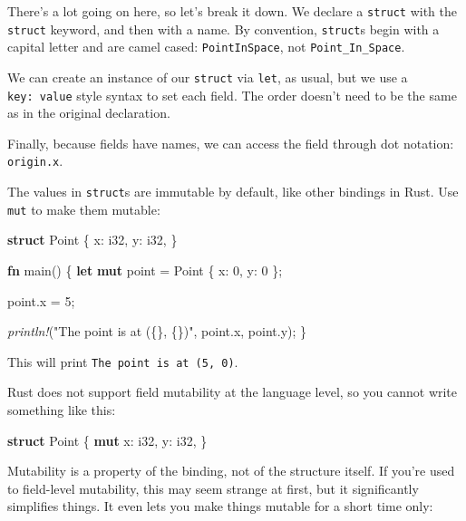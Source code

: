 \documentclass[a4paper,]{book}
\newenvironment{Shaded}{\begin{snugshade}}{\end{snugshade}}
\newcommand{\KeywordTok}[1]{\textcolor[rgb]{0.13,0.29,0.53}{\textbf{{#1}}}}
\newcommand{\DataTypeTok}[1]{\textcolor[rgb]{0.13,0.29,0.53}{{#1}}}
\newcommand{\DecValTok}[1]{\textcolor[rgb]{0.00,0.00,0.81}{{#1}}}
\newcommand{\StringTok}[1]{\textcolor[rgb]{0.31,0.60,0.02}{{#1}}}
\newcommand{\PreprocessorTok}[1]{\textcolor[rgb]{0.56,0.35,0.01}{\textit{{#1}}}}
\newcommand{\NormalTok}[1]{{#1}}
\begin{document}
There's a lot going on here, so let's break it down. We declare a
\texttt{struct} with the \texttt{struct} keyword, and then with a name.
By convention, \texttt{struct}s begin with a capital letter and are
camel cased: \texttt{PointInSpace}, not \texttt{Point\_In\_Space}.

We can create an instance of our \texttt{struct} via \texttt{let}, as
usual, but we use a \texttt{key:\ value} style syntax to set each field.
The order doesn't need to be the same as in the original declaration.

Finally, because fields have names, we can access the field through dot
notation: \texttt{origin.x}.

The values in \texttt{struct}s are immutable by default, like other
bindings in Rust. Use \texttt{mut} to make them mutable:

\begin{Shaded}
\begin{Highlighting}[]
\KeywordTok{struct} \NormalTok{Point \{}
    \NormalTok{x: }\DataTypeTok{i32}\NormalTok{,}
    \NormalTok{y: }\DataTypeTok{i32}\NormalTok{,}
\NormalTok{\}}

\KeywordTok{fn} \NormalTok{main() \{}
    \KeywordTok{let} \KeywordTok{mut} \NormalTok{point = Point \{ x: }\DecValTok{0}\NormalTok{, y: }\DecValTok{0} \NormalTok{\};}

    \NormalTok{point.x = }\DecValTok{5}\NormalTok{;}

    \PreprocessorTok{println!}\NormalTok{(}\StringTok{"The point is at (\{\}, \{\})"}\NormalTok{, point.x, point.y);}
\NormalTok{\}}
\end{Highlighting}
\end{Shaded}

This will print \texttt{The\ point\ is\ at\ (5,\ 0)}.

Rust does not support field mutability at the language level, so you
cannot write something like this:

\begin{Shaded}
\begin{Highlighting}[]
\KeywordTok{struct} \NormalTok{Point \{}
    \KeywordTok{mut} \NormalTok{x: }\DataTypeTok{i32}\NormalTok{,}
    \NormalTok{y: }\DataTypeTok{i32}\NormalTok{,}
\NormalTok{\}}
\end{Highlighting}
\end{Shaded}

Mutability is a property of the binding, not of the structure itself. If
you're used to field-level mutability, this may seem strange at first,
but it significantly simplifies things. It even lets you make things
mutable for a short time only:
\end{document}
